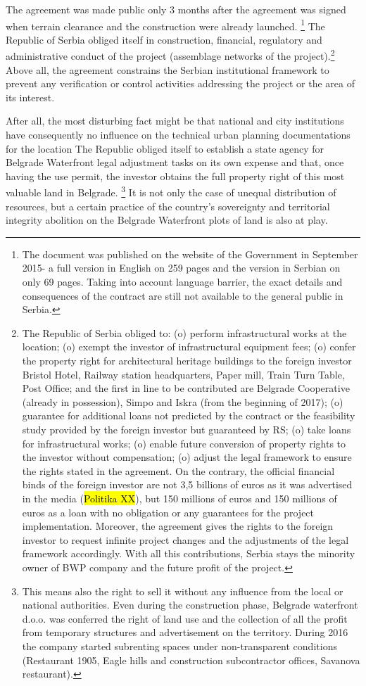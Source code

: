 \documentclass[11pt]{report}
\begin{document}
The agreement was made public only 3 months after the agreement was signed when terrain clearance and the construction were already launched.
\footnote{The document was published on the website of the Government in September 2015- a full version in English on 259 pages and the version in Serbian on only 69 pages. Taking into account language barrier, the exact details and consequences of the contract are still not available to the general public in Serbia.}
The Republic of Serbia obliged itself in construction, financial, regulatory and administrative conduct of the project (assemblage networks of the project).\footnote{The Republic of Serbia obliged to: 
(o) perform infrastructural works at the location;
(o) exempt the investor of infrastructural equipment fees;
(o) confer the property right for architectural heritage buildings to the foreign investor {Bristol Hotel, Railway station headquarters, Paper mill, Train Turn Table, Post Office; and the first in line to be contributed are Belgrade Cooperative (already in possession), Simpo and Iskra (from the beginning of 2017)};
(o) guarantee for additional loans not predicted by the contract or the feasibility study provided by the foreign investor but guaranteed by RS;
(o) take loans for infrastructural works;
(o) enable future conversion of property rights to the investor without compensation;
(o) adjust the legal framework to ensure the rights stated in the agreement.
On the contrary, the official financial binds of the foreign investor are not 3,5 billions of euros as it was advertised in the media (\hl{Politika XX}), but 150 millions of euros and 150 millions of euros as a loan with no obligation or any guarantees for the project implementation. Moreover, the agreement gives the rights to the foreign investor to request infinite project changes and the adjustments of the legal framework accordingly.
With all this contributions, Serbia stays the minority owner of BWP company and the future profit of the project.}
Above all, the agreement constrains the Serbian institutional framework to prevent any verification or control activities addressing the project or the area of its interest.

After all, the most disturbing fact might be that national and city institutions have consequently no influence on the technical urban planning documentations for the location
The Republic obliged itself to establish a state agency for Belgrade Waterfront legal adjustment tasks on its own expense and that, once having the use permit, the investor obtains the full  property right of this most valuable land in Belgrade.
\footnote{This means also the right to sell it without any influence from the local or national authorities. Even during the construction phase, Belgrade waterfront d.o.o. was conferred the right of land use and the collection of all the profit from temporary structures and advertisement on the territory. During 2016 the company started subrenting spaces under non-transparent conditions (Restaurant 1905, Eagle hills and construction subcontractor offices, Savanova restaurant).}
It is not only the case of unequal distribution of resources, but a certain practice of the country's sovereignty and territorial integrity abolition on the Belgrade Waterfront plots of land is also at play.
\end{document}
